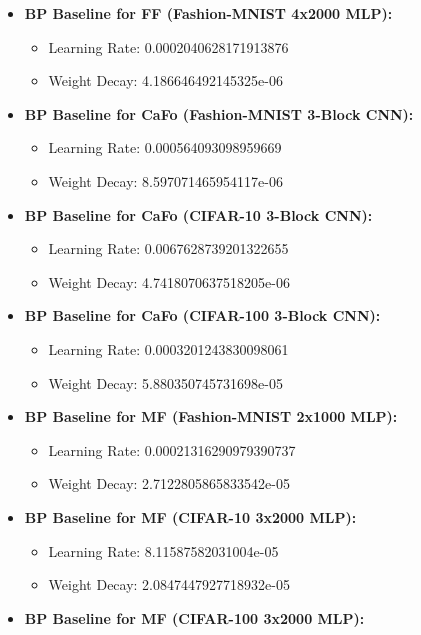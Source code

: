 \documentclass[11pt, english]{article}
\begin{document}
\begin{itemize}
    \item \textbf{BP Baseline for FF (Fashion-MNIST 4x2000 MLP):}
        \begin{itemize}
            \item Learning Rate: 0.0002040628171913876
            \item Weight Decay: 4.186646492145325e-06
        \end{itemize}
    \item \textbf{BP Baseline for CaFo (Fashion-MNIST 3-Block CNN):}
        \begin{itemize}
            \item Learning Rate: 0.000564093098959669
            \item Weight Decay: 8.597071465954117e-06
        \end{itemize}
     \item \textbf{BP Baseline for CaFo (CIFAR-10 3-Block CNN):}
        \begin{itemize}
            \item Learning Rate: 0.0067628739201322655
            \item Weight Decay: 4.7418070637518205e-06
        \end{itemize}
     \item \textbf{BP Baseline for CaFo (CIFAR-100 3-Block CNN):}
        \begin{itemize}
            \item Learning Rate: 0.0003201243830098061
            \item Weight Decay: 5.880350745731698e-05
        \end{itemize}
     \item \textbf{BP Baseline for MF (Fashion-MNIST 2x1000 MLP):}
        \begin{itemize}
            \item Learning Rate: 0.00021316290979390737
            \item Weight Decay: 2.7122805865833542e-05
        \end{itemize}
    \item \textbf{BP Baseline for MF (CIFAR-10 3x2000 MLP):}
            \begin{itemize}
                \item Learning Rate: 8.11587582031004e-05
                \item Weight Decay: 2.0847447927718932e-05
            \end{itemize}
    \item \textbf{BP Baseline for MF (CIFAR-100 3x2000 MLP):}

\end{itemize}
\end{document}

